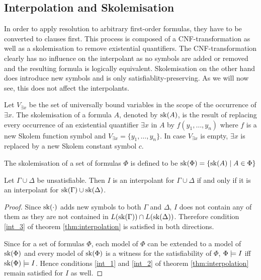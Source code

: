 \subsection{Interpolation and Skolemisation}

In order to apply resolution to arbitrary first-order formulas, they have to be converted to clauses first.
This process is composed of a CNF-transformation as well as a skolemisation to remove existential quantifiers.
The CNF-transformation clearly has no influence on the interpolant as no symbols are added or removed and the resulting formula is logically equivalent.
Skolemisation on the other hand does introduce new symbols and is only satisfiablity-preserving. As we will now see, this does not affect the interpolants.

\begin{defi}
	Let $V_{\exists x}$ be the set of universally bound variables in the scope of the occurrence of $\exists x$.
	The skolemisation of a formula $A$, denoted by $\mathrm{sk}(A)$, is the result of replacing every occurrence of an existential quantifier $\exists x$ in $A$ by $f(y_1, \ldots, y_n)$ where $f$ is a new Skolem function symbol and $V_{\exists x} = \{y_1, \ldots, y_n\}$.
	In case $V_{\exists x}$ is empty, $\exists x$ is replaced by a new Skolem constant symbol $c$.

	The skolemisation of a set of formulas $\Phi$ is defined to be $\mathrm{sk}(\Phi) = \{ \mathrm{sk}(A) \mid A \in \Phi \}$
\end{defi}


\begin{prop}
	Let $\Gamma \cup \Delta$ be unsatisfiable.
	Then $I$ is an interpolant for $\Gamma \cup \Delta$ if and only if it is an interpolant for $\mathrm{sk}(\Gamma) \cup \mathrm{sk}(\Delta)$. 
\end{prop}

\begin{proof}
	Since $\mathrm{sk}(\cdot)$ adds new symbols to both $\Gamma$ and $\Delta$, $I$ does not contain any of them as they are not contained in $L(\mathrm{sk}(\Gamma)) \cap L(\mathrm{sk}(\Delta))$.
	Therefore condition \ref{int_3} of theorem \ref{thm:interpolation} is satisfied in both directions.

	Since for a set of formulas $\Phi$, each model of $\Phi$ can be extended to a model of $\mathrm{sk}(\Phi)$ and every model of $\mathrm{sk}(\Phi)$ is a witness for the satisfiability of $\Phi$, $\Phi \models I$ iff $\mathrm{sk}(\Phi) \models I$.
	Hence conditions \ref{int_1} and \ref{int_2} of theorem \ref{thm:interpolation} remain satisfied for $I$ as well.
\end{proof}


